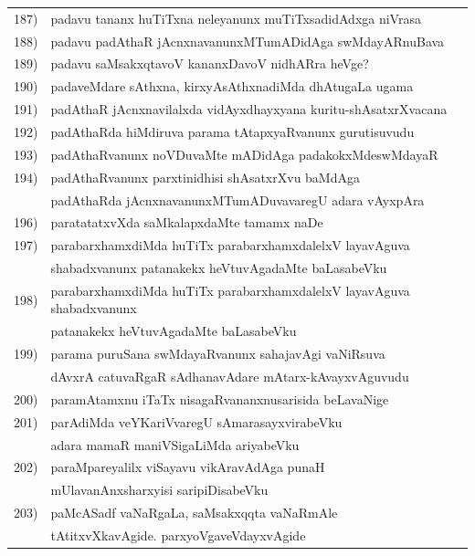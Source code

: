 {\begin{longtable}{@{}cp{7.4cm}r}
187) & padavu tananx huTiTxna neleyanunx muTiTxsadidAdxga niVrasa & \pageref{page182}\\ 
188) & padavu padAthaR jAcnxnavanunxMTumADidAga swMdayARnu\-Bava & \pageref{page200}\\
189) & padavu saMsakxqtavoV kananxDavoV nidhARra heVge? &  \pageref{page7}\\
190) & padaveMdare sAthxna, kirxyAsAthxnadiMda dhAtugaLa ugama & \pageref{page1a}\\
191) & padAthaR jAcnxnavilalxda vidAyxdhayxyana kuritu-shAsatxrXvacana & \pageref{page39}\\
192) & padAthaRda hiMdiruva parama tAtapxyaRvanunx gurutisuvudu & \pageref{page240}\\
193) & padAthaRvanunx noVDuvaMte mADidAga padakokxMde\break swMdayaR & \pageref{page201}\\
194) & padAthaRvanunx parxtinidhisi shAsatxrXvu baMdAga  & \\
     & padAthaRda jAcnxnavanunxMTumADuvavaregU adara vAyxpAra & \pageref{page198}\\
196) & paratatatxvXda saMkalapxdaMte tamamx naDe &  \pageref{page198}\\
197) & parabarxhamxdiMda huTiTx parabarxhamxdalelxV layavAguva & \\
     & shabadxvanunx patanakekx heVtuvAgadaMte baLasabeVku & \pageref{page192}\\
198) & parabarxhamxdiMda huTiTx parabarxhamxdalelxV layavAguva shabadxvanunx& \\ 
     & patanakekx heVtuvAgadaMte baLasabeVku  & \pageref{page192}\\
199) & parama puruSana swMdayaRvanunx sahajavAgi vaNiRsuva & \\
     & dAvxrA catuvaRgaR sAdhanavAdare mAtarx-kAvayxvAguvudu & \pageref{page193}\\ 
200) & paramAtamxnu iTaTx nisagaRvananxnusarisida beLavaNige & \pageref{page77}\\
201) & parAdiMda veYKariVvaregU sAmarasayxvirabeVku & \\
     & adara mamaR maniVSigaLiMda ariyabeVku & \pageref{page204}  \\
202) & paraMpareyalilx viSayavu vikAravAdAga punaH & \\
     & mUlavanAnxsharxyisi saripiDisabeVku & \pageref{page167}\\
203) & paMcASadf vaNaRgaLa, saMsakxqqta vaNaRmAle & \\
     & tAtitxvXkavAgide. parxyoVgaveVdayxvAgide & \pageref{page185}\\

\end{longtable}}
